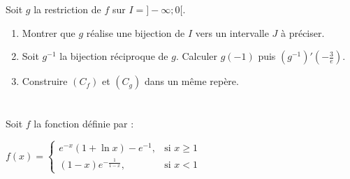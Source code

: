 \documentclass[12pt,a4paper]{article}
\begin{document}
Soit \( g \) la restriction de \( f \) sur \( I = ]-\infty; 0[ \).

\begin{enumerate}
    \item Montrer que \( g \) réalise une bijection de \( I \) vers un intervalle \( J \) à préciser.
    \item Soit \( g^{-1} \) la bijection réciproque de \( g \). Calculer \( g(-1) \) puis \( (g^{-1})'\left(-\frac{3}{e}\right) \).
    \item Construire \( (C_f) \) et \( (C_g) \) dans un même repère.
\end{enumerate}


\section*{}

Soit \( f \) la fonction définie par :

\( f(x) =
\begin{cases}
    e^{-x} (1 + \ln x) - e^{-1},  & \text{si } x \geq 1 \\
    (1 - x) e^{-\frac{1}{1 - x}}, & \text{si } x < 1
\end{cases} \)
\end{document}

